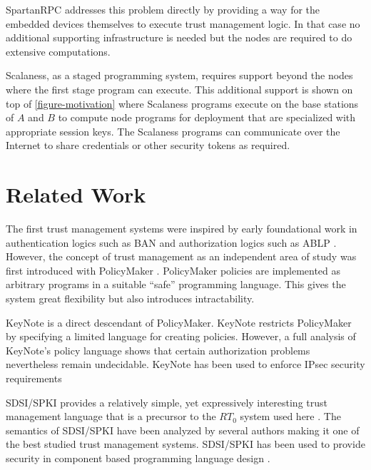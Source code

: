SpartanRPC addresses this problem directly by providing a way for the embedded devices
themselves to execute trust management logic. In that case no additional supporting
infrastructure is needed but the nodes are required to do extensive computations.

Scalaness, as a staged programming system, requires support beyond the nodes where the first
stage program can execute. This additional support is shown on top of
\autoref{figure-motivation} where Scalaness programs execute on the base stations of $A$ and $B$
to compute node programs for deployment that are specialized with appropriate session keys. The
Scalaness programs can communicate over the Internet to share credentials or other security
tokens as required.

\section{Related Work}


The first trust management systems were inspired by early foundational work in authentication
logics such as BAN \cite{Burrows:LA} and authorization logics such as ABLP \cite{Abadi:CACDS}.
However, the concept of trust management as an independent area of study was first introduced
with PolicyMaker \cite{Blaze:DTM,Blaze:CCPTMS}. PolicyMaker policies are implemented as
arbitrary programs in a suitable ``safe'' programming language. This gives the system great
flexibility but also introduces intractability.

KeyNote \cite{RFC-2704} is a direct descendant of PolicyMaker. KeyNote restricts PolicyMaker by
specifying a limited language for creating policies. However, a full analysis of KeyNote's
policy language \cite{Li:DCFTML} shows that certain authorization problems nevertheless remain
undecidable. KeyNote has been used to enforce IPsec security requirements
\cite{Blaze:TMIPS,Blaze:EKTMS}

SDSI/SPKI \cite{Rivest:SDSI-11,RFC-2693} provides a relatively simple, yet expressively
interesting trust management language that is a precursor to the $RT_0$ system used here . The
semantics of SDSI/SPKI have been analyzed by several authors
\cite{Abadi:OSLLNS,Halpern:LSSLLNS,Howell:FSS,Li:LNSS,Clarke:CCDSS} making it one of the best
studied trust management systems. SDSI/SPKI has been used to provide security in component based
programming language design \cite{Liu:CSI}.

